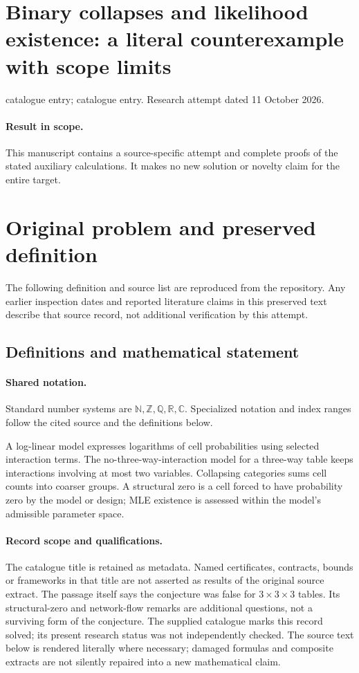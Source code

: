 \documentclass[11pt]{article}
\begin{document}
\section*{Binary collapses and likelihood existence: a literal counterexample with scope limits}
\noindent catalogue entry; catalogue entry. Research attempt dated 11 October 2026.
\paragraph{Result in scope.}This manuscript contains a source-specific attempt and complete proofs of the stated auxiliary calculations. It makes no new solution or novelty claim for the entire target.
\section{Original problem and preserved definition}
The following definition and source list are reproduced from the repository. Any earlier inspection dates and reported literature claims in this preserved text describe that source record, not additional verification by this attempt.
\subsection{Definitions and mathematical statement}

\paragraph{Shared notation.}Standard number systems are $\mathbb N,\mathbb Z,\mathbb Q,\mathbb R,\mathbb C$. Specialized notation and index ranges follow the cited source and the definitions below.


A log-linear model expresses logarithms of cell probabilities using selected interaction terms. The no-three-way-interaction model for a three-way table keeps interactions involving at most two variables. Collapsing categories sums cell counts into coarser groups. A structural zero is a cell forced to have probability zero by the model or design; MLE existence is assessed within the model's admissible parameter space.
\paragraph{Record scope and qualifications.}
The catalogue title is retained as metadata. Named certificates, contracts, bounds or frameworks in that title are not asserted as results of the original source extract.
The passage itself says the conjecture was false for $3\times3\times3$ tables. Its structural-zero and network-flow remarks are additional questions, not a surviving form of the conjecture. The supplied catalogue marks this record solved; its present research status was not independently checked.
The source text below is rendered literally where necessary; damaged formulas and composite extracts are not silently repaired into a new mathematical claim.
\end{document}
